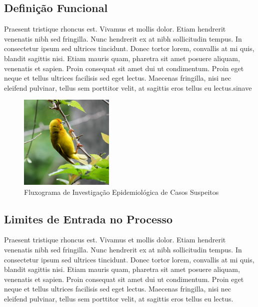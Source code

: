     \subsection{Definição Funcional}\label{subsec:definicao-funcional}
    Praesent tristique rhoncus est. Vivamus et mollis dolor. Etiam hendrerit venenatis nibh sed fringilla. Nunc hendrerit ex at nibh sollicitudin tempus. In consectetur ipsum sed ultrices tincidunt. Donec tortor lorem, convallis at mi quis, blandit sagittis nisi. Etiam mauris quam, pharetra sit amet posuere aliquam, venenatis et sapien. Proin consequat sit amet dui ut condimentum. Proin eget neque et tellus ultrices facilisis sed eget lectus. Maecenas fringilla, nisi nec eleifend pulvinar, tellus sem porttitor velit, at sagittis eros tellus eu lectus.\acrshort{sinave}

    \begin{figure}[htbp]
    \centering
    \includegraphics[width=0.4\textwidth]{exemplo/sample.jpeg}
    \caption{Fluxograma de Investigação Epidemiológica de Casos Suspeitos}
    \label{fig:fluxograma}
    \end{figure}
    
    \subsection{Limites de Entrada no Processo}\label{subsec:limites-de-entrada-no-processo}
    Praesent tristique rhoncus est. Vivamus et mollis dolor. Etiam hendrerit venenatis nibh sed fringilla. Nunc hendrerit ex at nibh sollicitudin tempus. In consectetur ipsum sed ultrices tincidunt. Donec tortor lorem, convallis at mi quis, blandit sagittis nisi. Etiam mauris quam, pharetra sit amet posuere aliquam, venenatis et sapien. Proin consequat sit amet dui ut condimentum. Proin eget neque et tellus ultrices facilisis sed eget lectus. Maecenas fringilla, nisi nec eleifend pulvinar, tellus sem porttitor velit, at sagittis eros tellus eu lectus.

